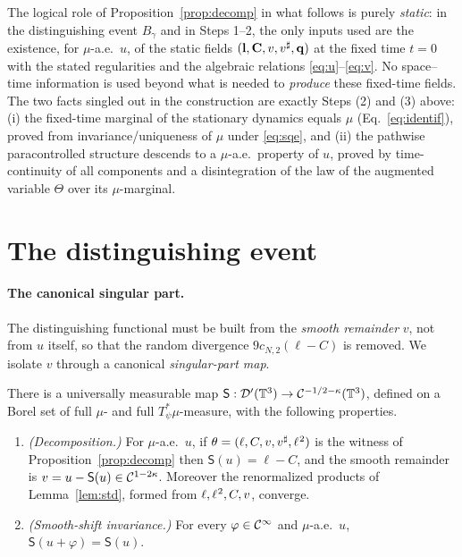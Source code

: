 \begin{remark}\label{rem:descent}
The logical role of Proposition~\ref{prop:decomp} in what follows is purely
\emph{static}: in the distinguishing event $B_\gamma$ and in Steps 1--2, the only
inputs used are the existence, for $\mu$-a.e.\ $u$, of the static fields
$(\mathbf{l},\mathbf{C},v,v^\sharp,\mathbf{q})$ at the fixed time $t=0$ with the stated
regularities and the algebraic relations \eqref{eq:u}--\eqref{eq:v}. No
space--time information is used beyond what is needed to \emph{produce} these
fixed-time fields. The two facts singled out in the construction are exactly Steps
(2) and (3) above: (i) the fixed-time marginal of the stationary dynamics equals
$\mu$ (Eq.~\eqref{eq:identif}), proved from invariance/uniqueness of $\mu$ under
\eqref{eq:sqe}, and (ii) the pathwise paracontrolled structure descends to a
$\mu$-a.e.\ property of $u$, proved by time-continuity of all components and a
disintegration of the law of the augmented variable $\Theta$ over its $\mu$-marginal.
\end{remark}

\section*{The distinguishing event}

\paragraph{The canonical singular part.}
The distinguishing functional must be built from the \emph{smooth remainder}
$v$, not from $u$ itself, so that the random divergence $9c_{N,2}(\ell-C)$ is
removed. We isolate $v$ through a canonical \emph{singular-part map}.

\begin{qoneproposition}\label{prop:S}
There is a universally measurable map
$\mathsf S:\mathcal{D}'(\mathbb{T}^3)\to\mathcal{C}^{-1/2-\kappa}(\mathbb{T}^3)$, defined on a Borel set of
full $\mu$- and full $T_\psi^*\mu$-measure, with the following properties.
\begin{enumerate}
\item[\rm(S1)] \emph{(Decomposition.)} For $\mu$-a.e.\ $u$, if
$\theta=(\ell,C,v,v^\sharp,\ell^{\hspace{0.5pt}2})$ is the witness of
Proposition~\ref{prop:decomp} then $\mathsf S(u)=\ell-C$, and the smooth remainder
is $v=u-\mathsf S(u)\in\mathcal{C}^{1-2\kappa}$. Moreover the renormalized products of
Lemma~\ref{lem:std}, formed from $\ell,\ell^{\hspace{0.5pt}2},C,v$, converge.
\item[\rm(S2)] \emph{(Smooth-shift invariance.)} For every $\varphi\in\mathcal{C}^\infty$
and $\mu$-a.e.\ $u$, $\mathsf S(u+\varphi)=\mathsf S(u)$.
\end{enumerate}
\end{qoneproposition}

